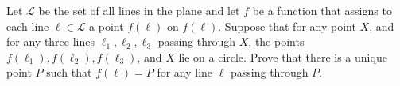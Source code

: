 Let $\mathcal L$ be the set of all lines in the plane and let $f$ be a function that assigns to each line $\ell\in\mathcal L$ a point $f(\ell)$ on $f(\ell)$. Suppose that for any point $X$, and for any three lines $\ell_1,\ell_2,\ell_3$ passing through $X$, the points $f(\ell_1),f(\ell_2),f(\ell_3)$, and $X$ lie on a circle.
Prove that there is a unique point $P$ such that $f(\ell)=P$ for any line $\ell$ passing through $P$.
